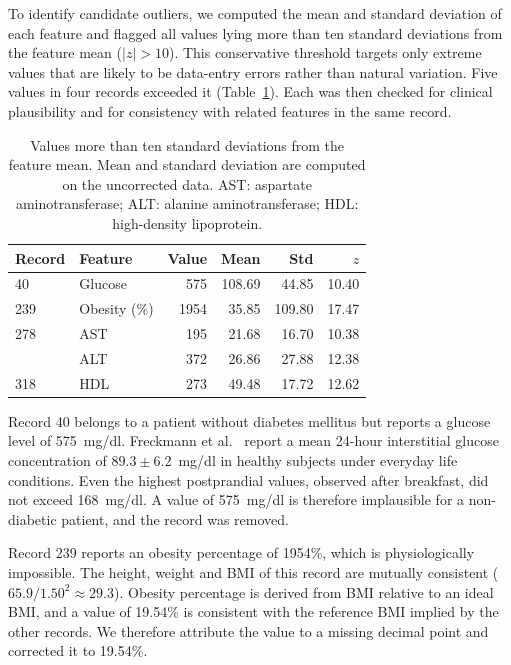 \documentclass[conference]{IEEEtran}
\begin{document}
To identify candidate outliers, we computed the mean and standard deviation of
each feature and flagged all values lying more than ten standard deviations
from the feature mean ($|z| > 10$). This conservative threshold targets only
extreme values that are likely to be data-entry errors rather than natural
variation. Five values in four records exceeded it
(Table~\ref{tab:outliers}). Each was then checked for clinical plausibility
and for consistency with related features in the same record.

\begin{table}[h]
\centering
\caption{Values more than ten standard deviations from the feature mean.
Mean and standard deviation are computed on the uncorrected data.
AST: aspartate aminotransferase; ALT: alanine aminotransferase;
HDL: high-density lipoprotein.}
\label{tab:outliers}
\begin{tabular}{llrrrr}
\hline
Record & Feature & Value & Mean & Std & $z$ \\
\hline
40  & Glucose      & 575  & 108.69 & 44.85  & 10.40 \\
239 & Obesity (\%) & 1954 & 35.85  & 109.80 & 17.47 \\
278 & AST          & 195  & 21.68  & 16.70  & 10.38 \\
    & ALT          & 372  & 26.86  & 27.88  & 12.38 \\
318 & HDL          & 273  & 49.48  & 17.72  & 12.62 \\
\hline
\end{tabular}
\end{table}

Record 40 belongs to a patient without diabetes mellitus but reports a glucose
level of 575~mg/dl. Freckmann et al.~\cite{freckmann2007glucose} report a mean
24-hour interstitial glucose concentration of $89.3 \pm 6.2$~mg/dl in healthy
subjects under everyday life conditions. Even the highest postprandial values,
observed after breakfast, did not exceed 168~mg/dl. A value of 575~mg/dl is
therefore implausible for a non-diabetic patient, and the record was removed.

Record 239 reports an obesity percentage of 1954\%, which is physiologically
impossible. The height, weight and BMI of this record are mutually consistent
($65.9 / 1.50^2 \approx 29.3$). Obesity percentage is derived from BMI relative
to an ideal BMI, and a value of 19.54\% is consistent with the reference BMI
implied by the other records. We therefore attribute the value to a missing
decimal point and corrected it to 19.54\%.
\end{document}

